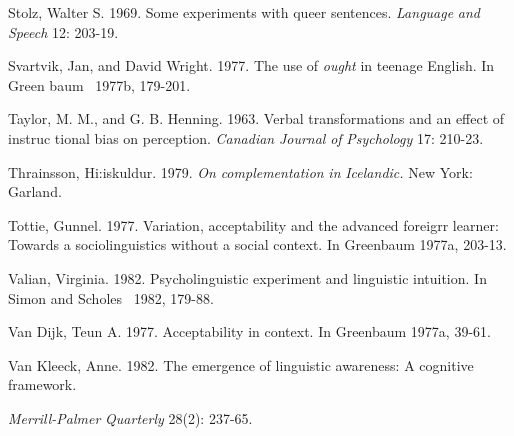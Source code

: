 \begin{styleStandard}
Stolz, Walter S. 1969. Some experiments with queer sentences. \textit{Language}\textit{ }\textit{and}\textit{ }\textit{Speech}\textit{ }12: 203-19.
\end{styleStandard}


\begin{styleStandard}
Svartvik, Jan, and David Wright. 1977. The use of \textit{ought}\textit{ }in teenage English. In Green\- baum \ 1977b, 179-201.
\end{styleStandard}


\begin{styleStandard}
Taylor, M. M., and G. B. Henning. 1963. Verbal transformations and an effect of instruc\- tional bias on perception. \textit{Canadian}\textit{ }\textit{Journal}\textit{ }\textit{of}\textit{ }\textit{Psychology}\textit{ }17: 210-23.
\end{styleStandard}


\begin{styleStandard}
Thrainsson, Hi:iskuldur. 1979. \textit{On}\textit{ }\textit{complementation}\textit{ }\textit{in}\textit{ }\textit{Icelandic.}\textit{ }New York: Garland.
\end{styleStandard}


\clearpage\setcounter{page}{1}\begin{styleStandard}
Tottie, Gunnel. 1977. Variation, acceptability and the advanced foreigrr learner: Towards a sociolinguistics without a social context. In Greenbaum 1977a, 203-13.
\end{styleStandard}


\begin{styleStandard}
Valian, Virginia. 1982. Psycholinguistic experiment and linguistic intuition. In Simon and Scholes \ 1982, 179-88.
\end{styleStandard}


\begin{styleStandard}
Van Dijk, Teun A. 1977. Acceptability in context. In Greenbaum 1977a, 39-61.
\end{styleStandard}


\begin{styleStandard}
Van Kleeck, Anne. 1982. The emergence of linguistic awareness: A cognitive framework.
\end{styleStandard}


\begin{styleStandard}
\textit{Merrill-Palmer}\textit{ }\textit{Quarterly}\textit{ }28(2): 237-65.
\end{styleStandard}


